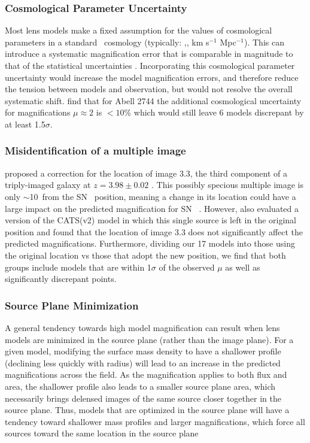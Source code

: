 \subsubsection{Cosmological Parameter Uncertainty}
Most lens models make a
fixed assumption for the values of cosmological parameters in a
standard \LCDM\ cosmology (typically: ,, km
s$^{-1}$ Mpc$^{-1}$). This can introduce a systematic magnification
error that is comparable in magnitude to that of the statistical
uncertainties \citep{Zitrin:2014b,Bayliss:2015}.  
Incorporating this
cosmological parameter uncertainty would increase the model magnification 
errors, and therefore reduce the tension between models and observation, but would not
resolve the overall systematic shift.  \citet{Bayliss:2015} find that for Abell 2744 the additional cosmological uncertainty for magnifications $\mu\approx2$ is $<10\%$ which would still leave 6 models discrepant by at least 1.5$\sigma$. 


\subsubsection{Misidentification of a multiple image}
\citet{Jauzac:2015b} proposed a correction
for the location of image 3.3, the third component of a triply-imaged
galaxy \citep{Merten:2011} at $z=3.98\pm0.02$ \citep{Johnson:2014}.
This possibly specious multiple image is only $\sim$10\arcsec\ from
the SN \tomas\ position, meaning a change in its location could have a
large impact on the predicted magnification for
SN \tomas\ \citep[see][for a quantitative discussion of this
effect]{Johnson:2014}.  However, \citet{Jauzac:2015b} also evaluated a
version of the CATS(v2) model in which this single source is left in
the original position and found that the location of image 3.3 does
not significantly affect the predicted magnifications.  Furthermore,
dividing our 17 models into those using the original location vs those
that adopt the new position, we find that both groups include models
that are within 1$\sigma$ of the observed $\mu$ as well as
significantly discrepant points.

\subsubsection{Source Plane Minimization}
\label{sec:SourcePlaneMinimization}

A general tendency towards high model magnification can result when
lens models are minimized in the source plane (rather than the image
plane).  For a given model, modifying the surface mass density to have
a shallower profile (declining less quickly with radius) will lead to
an increase in the predicted magnifications across the field.  As the
magnification applies to both flux and area, the shallower profile
also leads to a smaller source plane area, which necessarily brings
delensed images of the same source closer together in the source
plane.  Thus, models that are  optimized in the source
plane will have a tendency toward shallower mass profiles and larger
magnifications, which force all sources toward the same location in
the source plane 

